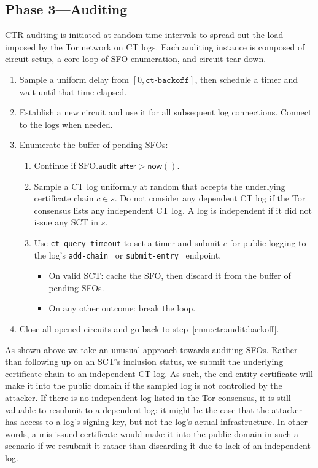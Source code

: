 \subsection{Phase 3---Auditing} \label{sec:design-ca:phase3}
CTR auditing is initiated at random time intervals to spread out the load
imposed by the Tor network on CT logs.  Each auditing instance is composed of
circuit setup, a core loop of SFO enumeration, and circuit tear-down.

\begin{enumerate}
	\item\label{enm:ctr:audit:backoff} Sample a uniform delay from
			$[0, \texttt{ct-backoff}]$,
		then schedule a timer and wait until that time elapsed.
	\item\label{enm:ctr:audit:log-circuit} Establish a new circuit and use it
		for all subsequent log connections.  Connect to the logs when needed.
	\item\label{enm:ctr:audit:loop} Enumerate the buffer of pending SFOs:
		\begin{enumerate}
			\item\label{enm:ctr:audit:too-soon} Continue if
				$\textrm{SFO}.\mathsf{audit\_after} > \mathsf{now}()$.
			\item\label{enm:ctr:audit:sample}
				Sample a CT log uniformly at random that accepts the underlying
				certificate chain $c \in s$.  Do not consider any dependent CT
				log if the Tor consensus lists any independent CT log.  A log
				is independent if it did not issue any SCT in $s$.
			\item\label{enm:ctr:audit:log} Use \texttt{ct-query-timeout} to set
				a timer and submit $c$ for public logging to the log's
				\texttt{add-chain}~\cite{ct} or
				\texttt{submit-entry}~\cite{ct/bis} endpoint.
				\begin{itemize}
					\item\label{enm:ctr:audit:log:success} On valid
						SCT: cache the SFO, then discard it from the buffer of
						pending SFOs.
					\item\label{enm:ctr:audit:log:fail} On any other outcome:
						break the loop.
				\end{itemize}
		\end{enumerate}
	\item\label{enm:ctr:audit:teardown} Close all opened circuits and go back to
		step~\ref{enm:ctr:audit:backoff}.
\end{enumerate}

As shown above we take an unusual approach towards auditing SFOs.  Rather than
following up on an SCT's inclusion status, we submit the underlying certificate
chain to an independent CT log.  As such, the end-entity certificate will make
it into the public domain if the sampled log is not controlled by the attacker.
If there is no independent log listed in the Tor consensus, it is still valuable
to resubmit to a dependent log:
	it might be the case that the attacker has access to a log's signing key,
	but not the log's actual infrastructure.
In other words, a mis-issued certificate would make it into the public domain in
such a scenario if we resubmit it rather than discarding it due to lack of
an independent log.

